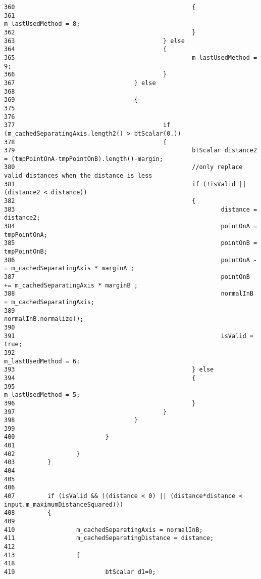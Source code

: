 \begin{Code}
\begin{verbatim}
360                                                 {
361                                                         m_lastUsedMethod = 8;
362                                                 }
363                                         } else
364                                         {
365                                                 m_lastUsedMethod = 9;
366                                         }
367                                 } else
368 
369                                 {
375 
376                                 
377                                         if (m_cachedSeparatingAxis.length2() > btScalar(0.))
378                                         {
379                                                 btScalar distance2 = (tmpPointOnA-tmpPointOnB).length()-margin;
380                                                 //only replace valid distances when the distance is less
381                                                 if (!isValid || (distance2 < distance))
382                                                 {
383                                                         distance = distance2;
384                                                         pointOnA = tmpPointOnA;
385                                                         pointOnB = tmpPointOnB;
386                                                         pointOnA -= m_cachedSeparatingAxis * marginA ;
387                                                         pointOnB += m_cachedSeparatingAxis * marginB ;
388                                                         normalInB = m_cachedSeparatingAxis;
389                                                         normalInB.normalize();
390 
391                                                         isValid = true;
392                                                         m_lastUsedMethod = 6;
393                                                 } else
394                                                 {
395                                                         m_lastUsedMethod = 5;
396                                                 }
397                                         }
398                                 }
399                                 
400                         }
401 
402                 }
403         }
404 
405         
406 
407         if (isValid && ((distance < 0) || (distance*distance < input.m_maximumDistanceSquared)))
408         {
409 
410                 m_cachedSeparatingAxis = normalInB;
411                 m_cachedSeparatingDistance = distance;
412 
413                 {
418 
419                         btScalar d1=0;

\end{verbatim}
\end{Code}
